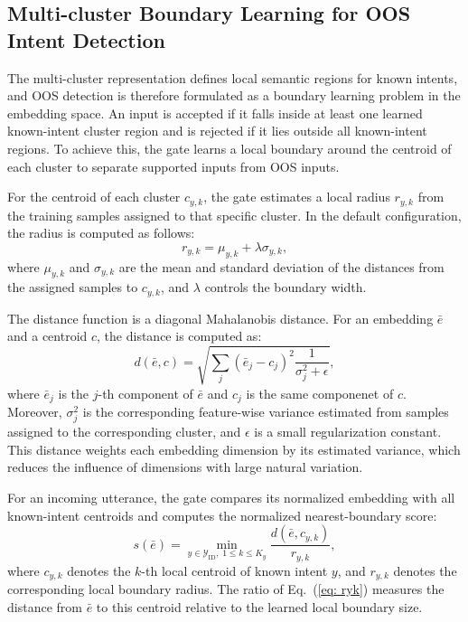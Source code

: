 \documentclass[11pt]{article}
\begin{document}
\subsection{Multi-cluster Boundary Learning for OOS Intent Detection}
The multi-cluster representation defines local semantic regions for known intents, and OOS detection is therefore formulated as a boundary learning problem in the embedding space. An input is accepted if it falls inside at least one learned known-intent cluster region and is rejected if it lies outside all known-intent regions. To achieve this, the gate learns a local boundary around the centroid of each cluster to separate supported inputs from OOS inputs.

For the centroid of each cluster $c_{y,k}$, the gate estimates a local radius $r_{y,k}$ from the training samples assigned to that specific cluster. In the default configuration, the radius is computed as follows:
\begin{equation}
r_{y,k}=\mu_{y,k} + \lambda \sigma_{y,k},
\label{eq: lambda}
\end{equation}
where $\mu_{y,k}$ and $\sigma_{y,k}$ are the mean and standard deviation of the distances from the assigned samples to $c_{y,k}$, and $\lambda$ controls the boundary width.

The distance function is a diagonal Mahalanobis distance. For an embedding $\bar{e}$ and a centroid $c$, the distance is computed as:
\begin{equation}
d(\bar{e},c)=\sqrt{\sum_j(\bar{e}_j-c_j)^2\frac{1}{\sigma_j^2+\epsilon}},
\end{equation}
where $\bar{e}_j$ is the $j$-th component of $\bar{e}$ and $c_j$ is the same componenet of $c$. Moreover, $\sigma_j^2$ is the corresponding feature-wise variance estimated from samples assigned to the corresponding cluster, and $\epsilon$ is a small regularization constant. This distance weights each embedding dimension by its estimated variance, which reduces the influence of dimensions with large natural variation.

For an incoming utterance, the gate compares its normalized embedding with all known-intent centroids and computes the normalized nearest-boundary score:
\begin{equation}
s(\bar{e})=\min_{y \in \mathcal{Y}_{\mathrm{ID}},\; 1 \le k \le K_y}\frac{d(\bar{e},c_{y,k})}{r_{y,k}},
\label{eq: ryk}
\end{equation}
where $c_{y,k}$ denotes the $k$-th local centroid of known intent $y$, and $r_{y,k}$ denotes the corresponding local boundary radius. The ratio of Eq.~(\ref{eq: ryk}) measures the distance from $\bar{e}$ to this centroid relative to the learned local boundary size.
\end{document}

